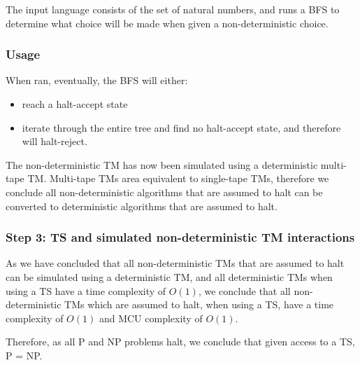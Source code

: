 \documentclass{report}
\begin{document}
The input language consists of the set of natural numbers, and runs a BFS to determine what choice will be made when given a non-deterministic choice.

\subsubsection{Usage}

When ran, eventually, the BFS will either:
\begin{itemize}
  \item reach a halt-accept state
  \item iterate through the entire tree and find no halt-accept state, and therefore will halt-reject.
\end{itemize}

The non-deterministic TM has now been simulated using a deterministic multi-tape TM. Multi-tape TMs area equivalent to single-tape TMs, therefore we conclude all non-deterministic algorithms that are assumed to halt can be converted to deterministic algorithms that are assumed to halt.

\subsubsection{Step 3: TS and simulated non-deterministic TM interactions}
As we have concluded that all non-deterministic TMs that are assumed to halt can be simulated using a deterministic TM, and all deterministic TMs when using a TS have a time complexity of $O(1)$, we conclude that all non-deterministic TMs which are assumed to halt, when using a TS, have a time complexity of $O(1)$ and MCU complexity of $O(1)$.

Therefore, as all P and NP problems halt, we conclude that given access to a TS, P = NP.
\end{document}
